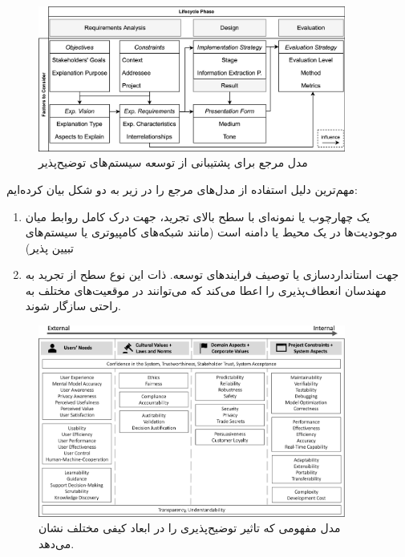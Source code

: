 \begin{figure}[H]
    \centering
    \includegraphics[width=0.9\textwidth]{images/reference_model.png}
    \caption{مدل مرجع برای پشتیبانی از توسعه سیستم‌های توضیح‌پذیر}
    \label{fig:referenceModel}
\end{figure}

مهم‌ترین دلیل استفاده از مدل‌های مرجع را در زیر به دو شکل بیان کرده‌ایم:

\begin{enumerate}
    \item یک چهارچوب یا نمونه‌ای با سطح بالای تجرید، جهت درک کامل روابط میان
    موجودیت‌ها در یک محیط یا دامنه است (مانند شبکه‌های کامپیوتری یا سیستم‌های
    تبیین پذیر)
    \item جهت استانداردسازی یا توصیف فرایند‌های توسعه. ذات این نوع سطح از تجرید
    به مهندسان انعطاف‌پذیری را اعطا می‌کند که می‌توانند در موقعیت‌های مختلف به
    راحتی سازگار شوند.
\end{enumerate}

\begin{figure}[H]
    \centering
    \includegraphics[width=0.9\textwidth]{images/conceptual_model.png}
    \caption{مدل مفهومی که تاثیر توضیح‌پذیری را در ابعاد کیفی مختلف نشان
    می‌دهد.}
    \label{fig:conceptualmodel}
\end{figure}

